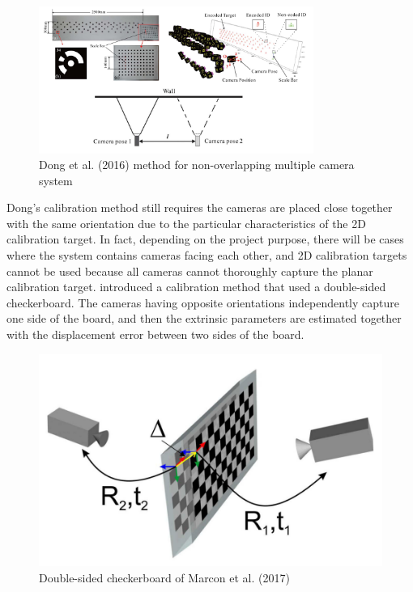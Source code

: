 \begin{figure}[ht]
\centering
\includegraphics[width=0.8\textwidth]{Images/Dong (2016).jpg}
\caption{Dong et al. (2016) method for non-overlapping multiple camera system}
\end{figure}

Dong's calibration method still requires the cameras are placed close together with the same orientation due to the particular characteristics of the 2D calibration target. In fact, depending on the project purpose, there will be cases where the system contains cameras facing each other, and 2D calibration targets cannot be used because all cameras cannot thoroughly capture the planar calibration target. \cite{Marcon2017} introduced a calibration method that used a double-sided checkerboard. The cameras having opposite orientations independently capture one side of the board, and then the extrinsic parameters are estimated together with the displacement error between two sides of the board.

\begin{figure}[ht]
\centering
\includegraphics[width=1\textwidth]{Images/Marcon (2017).png}
\caption{Double-sided checkerboard of Marcon et al. (2017)}
\end{figure}


